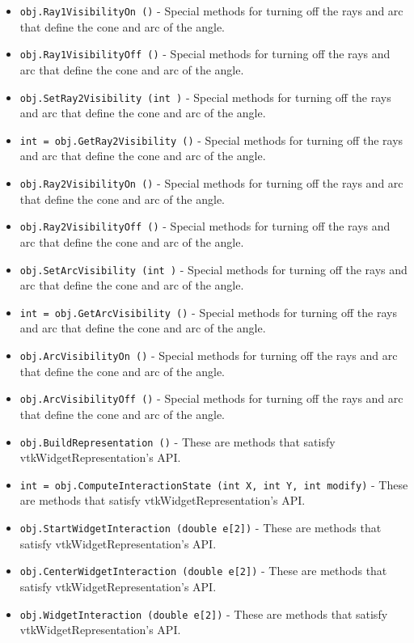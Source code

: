 \begin{itemize}
\item  \verb|obj.Ray1VisibilityOn ()| -  Special methods for turning off the rays and arc that define the cone
 and arc of the angle.

\item  \verb|obj.Ray1VisibilityOff ()| -  Special methods for turning off the rays and arc that define the cone
 and arc of the angle.

\item  \verb|obj.SetRay2Visibility (int )| -  Special methods for turning off the rays and arc that define the cone
 and arc of the angle.

\item  \verb|int = obj.GetRay2Visibility ()| -  Special methods for turning off the rays and arc that define the cone
 and arc of the angle.

\item  \verb|obj.Ray2VisibilityOn ()| -  Special methods for turning off the rays and arc that define the cone
 and arc of the angle.

\item  \verb|obj.Ray2VisibilityOff ()| -  Special methods for turning off the rays and arc that define the cone
 and arc of the angle.

\item  \verb|obj.SetArcVisibility (int )| -  Special methods for turning off the rays and arc that define the cone
 and arc of the angle.

\item  \verb|int = obj.GetArcVisibility ()| -  Special methods for turning off the rays and arc that define the cone
 and arc of the angle.

\item  \verb|obj.ArcVisibilityOn ()| -  Special methods for turning off the rays and arc that define the cone
 and arc of the angle.

\item  \verb|obj.ArcVisibilityOff ()| -  Special methods for turning off the rays and arc that define the cone
 and arc of the angle.

\item  \verb|obj.BuildRepresentation ()| -  These are methods that satisfy vtkWidgetRepresentation's API.

\item  \verb|int = obj.ComputeInteractionState (int X, int Y, int modify)| -  These are methods that satisfy vtkWidgetRepresentation's API.

\item  \verb|obj.StartWidgetInteraction (double e[2])| -  These are methods that satisfy vtkWidgetRepresentation's API.

\item  \verb|obj.CenterWidgetInteraction (double e[2])| -  These are methods that satisfy vtkWidgetRepresentation's API.

\item  \verb|obj.WidgetInteraction (double e[2])| -  These are methods that satisfy vtkWidgetRepresentation's API.

\end{itemize}

